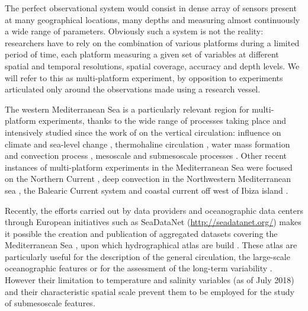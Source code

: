 \documentclass[essd]{copernicus}
\begin{document}
The perfect observational system would consist in dense array of sensors present at many geographical locations, many depths and measuring almost continuously a wide range of parameters. Obviously such a system is not the reality: researchers have to rely on the combination of various platforms during a limited period of time, each platform measuring a given set of variables at different spatial and temporal resolutions, spatial coverage, accuracy and depth levels. We will refer to this as multi-platform experiment, by opposition to experiments articulated only around the observations made using a research vessel. 

The western Mediterranean Sea is a particularly relevant region for multi-platform experiments, thanks to the wide range of processes taking place and intensively studied since the work of \cite{WUST61} on the vertical circulation: influence on climate \citep[e.g.,][]{GIORGI06,GIORGI08,ADLOFF15,GUIOT16,RAHMSTORF98} and sea-level change \citep[e.g.,][]{TSIMPLIS02,BONADUCE16,WOLFF18}, thermohaline circulation \citep[e.g.,][]{BERGAMASCO10,MILLOT87,MILLOT91,MILLOT99,SKLIRIS14,ROBINSON01}, water mass formation and convection process \citep[e.g.,][]{STOMMEL72,SEND1999,MACIAS18}, mesoscale \citep[e.g.,][]{ALVAREZ96,PINOT95,PUJOL05,SANCHEZROMAN17} and submesoscale processes \citep[e.g.,][]{BOSSE15,DAMIEN17,TESTOR03,TESTOR18}. Other recent instances of multi-platform experiments in the Mediterranean Sea were focused on the Northern Current \citep[December 2011,][]{BERTA18}, deep convection in the Northwestern Mediterranean sea \citep[July 2012--October 2013,][]{TESTOR18}, the Balearic Current system \citep[July and November 2007, April and June 2008,][]{BOUFFARD10} and coastal current off west of Ibiza island \citep[August 2013,][]{TROUPIN15}.

Recently, the efforts carried out by data providers and oceanographic data centers through European initiatives such as SeaDataNet (\url{http://seadatanet.org/}) makes it possible the creation and publication of aggregated datasets covering the Mediterranean Sea \citep{SIMONCELLI14}, upon which hydrographical atlas are build \citep[e.g.][]{SIMONCELLI16,IONA18a}. These atlas are particularly useful for the description of the general circulation, the large-scale oceanographic features or for the assessment of the long-term variability \citep{IONA18b}. However their limitation to temperature and salinity variables (as of July 2018) and their characteristic spatial scale prevent them to be employed for the study of submesoscale features.
\end{document}
